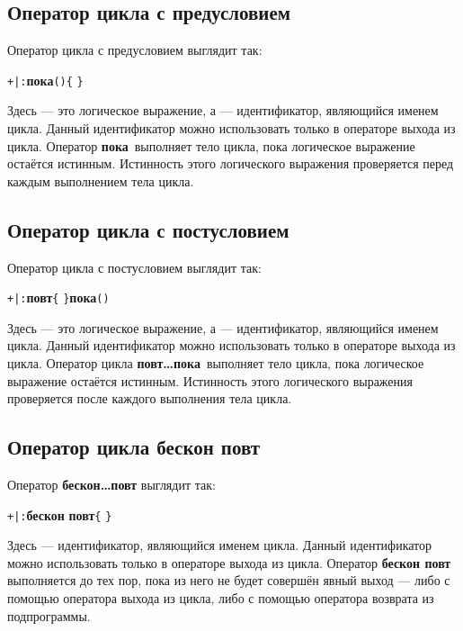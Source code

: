 \documentclass[10pt]{report}
\begin{document}
\subsection{Оператор цикла с предусловием}
Оператор цикла с предусловием выглядит так:
\begin{center}
	\rbo\texttt{+|}\texttt{:}\rbc\optional\textbf{пока}\texttt{(}\texttt{)}\texttt{\{}\rbo{} \sor {}\rbc\kleene\texttt{\}}
\end{center}
Здесь  --- это логическое выражение, а   --- идентификатор, являющийся именем цикла. Данный идентификатор можно использовать только в операторе выхода из цикла. Оператор \textbf{\glqq пока\grqq}\ выполняет тело цикла, пока логическое выражение  остаётся истинным. Истинность этого логического выражения проверяется перед каждым выполнением тела цикла.

\subsection{Оператор цикла с постусловием}
Оператор цикла с постусловием выглядит так:
\begin{center}
	\rbo\texttt{+|}\texttt{:}\rbc\optional\textbf{повт}\texttt{\{}\rbo{} \sor {}\rbc\kleene\texttt{\}}\textbf{пока}\texttt{(}\texttt{)}
\end{center}
Здесь  --- это логическое выражение, а  \textcolor{Green}{} --- идентификатор, являющийся именем цикла. Данный идентификатор можно использовать только в операторе выхода из цикла. Оператор цикла \textbf{\glqq повт\dots пока\grqq}\ выполняет тело цикла, пока логическое выражение  остаётся истинным. Истинность этого логического выражения проверяется после каждого выполнения тела цикла.   

\subsection{Оператор цикла \glqq бескон повт\grqq}
Оператор \textbf{\glqq бескон\dots повт\grqq} выглядит так:
\begin{center}
	\rbo\texttt{+|}\texttt{:}\rbc\optional\textbf{бескон} \textbf{повт}\texttt{\{}\rbo{} \sor {}\rbc\kleene\texttt{\}}
\end{center}
Здесь \textcolor{Green}{} --- идентификатор, являющийся именем цикла. Данный идентификатор можно использовать только в операторе выхода из цикла. Оператор \textbf{\glqq бескон повт\grqq} выполняется до тех пор, пока из него не будет совершён явный выход --- либо с помощью оператора выхода из цикла, либо с помощью оператора возврата из подпрограммы.
   
\end{document}
